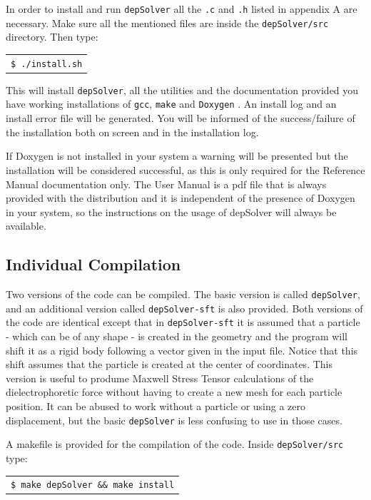 \documentclass[12pt]{report}
\begin{document}
In order to install and run \verb+depSolver+ all the \verb+.c+ and \verb+.h+ listed in appendix A are necessary. Make sure all the mentioned files are inside the \verb+depSolver/src+ directory. Then type:

\begin{tabular}{l}
\texttt{\$ ./install.sh}
\end{tabular}

This will install \verb+depSolver+, all the utilities and the documentation provided you have working installations of \verb+gcc+, \verb+make+ and \verb+Doxygen+ \cite{doxygen}. An install log and an install error file will be generated. You will be informed of the success/failure of the installation both on screen and in the installation log.

If Doxygen is not installed in your system a warning will be presented but the installation will be considered successful, as this is only required for the Reference Manual documentation only. The User Manual is a pdf file that is always provided with the distribution and it is independent of the presence of Doxygen in your system, so the instructions on the usage of depSolver will always be available.

\subsection{Individual Compilation}
Two versions of the code can be compiled. The basic version is called \verb+depSolver+, and an additional version called \verb+depSolver-sft+ is also provided. Both versions of the code are identical except that in \verb+depSolver-sft+ it is assumed that a particle - which can be of any shape - is created in the geometry and the program will shift it as a rigid body following a vector given in the input file. Notice that this shift assumes that the particle is created at the center of coordinates. This version is useful to produme Maxwell Stress Tensor calculations of the dielectrophoretic force without having to create a new mesh for each particle position. It can be abused to work without a particle or using a zero displacement, but the basic \verb+depSolver+ is less confusing to use in those cases.

A makefile is provided for the compilation of the code. Inside \verb+depSolver/src+ type:

\begin{tabular}{l}
\texttt{\$ make depSolver \&\& make install}
\end{tabular}
\end{document}
